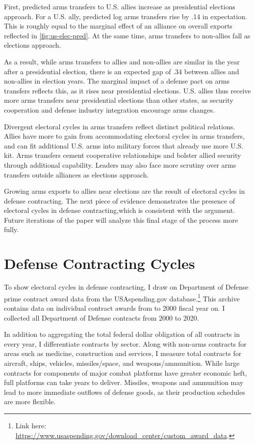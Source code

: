 \documentclass[12pt]{article}
\begin{document}
First, predicted arms transfers to U.S. allies increase as presidential elections approach.
For a U.S. ally, predicted log arms transfers rise by .14 in expectation. 
This is roughly equal to the marginal effect of an alliance on overall exports reflected in \autoref{fig:us-elec-pred}.
At the same time, arms transfers to non-allies fall as elections approach. 


As a result, while arms transfers to allies and non-allies are similar in the year after a presidential election, there is an expected gap of .34 between allies and non-allies in election years.
The marginal impact of a defense pact on arms transfers reflects this, as it rises near presidential elections.
U.S. allies thus receive more arms transfers near presidential elections than other states, as security cooperation and defense industry integration encourage arms changes.


Divergent electoral cycles in arms transfers reflect distinct political relations.
Allies have more to gain from accommodating electoral cycles in arms transfers, and can fit additional U.S. arms into military forces that already use more U.S. kit.
Arms transfers cement cooperative relationships and bolster allied security through additional capability.
Leaders may also face more scrutiny over arms transfers outside alliances as elections approach. 


Growing arms exports to allies near elections are the result of electoral cycles in defense contracting. 
The next piece of evidence demonstrates the presence of electoral cycles in defense contracting,which is consistent with the argument.  
Future iterations of the paper will analyze this final stage of the process more fully. 



\section{Defense Contracting Cycles}


To show electoral cycles in defense contracting, I draw on Department of Defense prime contract award data from the USAspending.gov database.\footnote{Link here: \url{https://www.usaspending.gov/download_center/custom_award_data}.} 
This archive contains data on individual contract awards from to 2000 fiscal year on.
I collected all Department of Defense contracts from 2000 to 2020.


In addition to aggregating the total federal dollar obligation of all contracts in every year, I differentiate contracts by sector.
Along with non-arms contracts for areas such as medicine, construction and services, I measure total contracts for aircraft, ships, vehicles, missiles/space, and weapons/ammunition. 
While large contracts for components of major combat platforms have greater economic heft, full platforms can take years to deliver. 
Missiles, weapons and ammunition may lead to more immediate outflows of defense goods, as their production schedules are more flexible.
\end{document}
